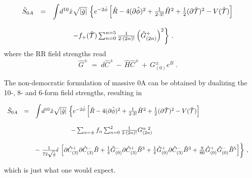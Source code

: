 \documentclass[12pt,a4paper]{article}
\begin{document}
\begin{equation}
\label{eq:0Aaction-2}
\begin{array}{rcl}
\hat{S}_{0A} & = & {\displaystyle\int} d^{10}\hat{x}\sqrt{|\hat{g}|}\,
\left\{e^{-2\hat{\phi}} \left[ \hat{R} -4(\partial\hat{\phi})^{2}
+\frac{1}{2\cdot 3!}\hat{H}^{2}+\frac{1}{2}(\partial\hat{\cal T})^{2}
-V(\hat{\cal T})\right] \right.\\
& & \\
& & 
\hspace{1cm}
\left.
-f_{+}(\hat{\cal T})\sum_{n=0}^{n=5}\frac{1}{2\cdot (2n)!}
\left(\hat{G}_{(2n)}^{+}\right)^{2} 
\right\}\, .\\
\end{array}
\end{equation}
where the RR field strengths read
\begin{equation}
  \hat{G}^{\pm}\;=\; d\hat{C}^{\pm}\,-\,\hat{H}\hat{C}^{\pm}\,+\,
                     G_{(0)}^{\pm}e^{B}\; .
\end{equation}

The non-democratic formulation of massive 0A can be obtained by
dualizing the 10-, 8- and 6-form field strengths, resulting in


\begin{equation}
\label{eq:CS0A-3}
\begin{array}{rcl}
\hat{S}_{0A} & = & {\displaystyle\int} d^{10}\hat{x}\sqrt{|\hat{g}|}\,
\left\{e^{-2\hat{\phi}} \left[ \hat{R} -4(\partial\hat{\phi})^{2}
+\frac{1}{2\cdot 3!}\hat{H}^{2}+\frac{1}{2}(\partial\hat{\cal T})^{2}
-V(\hat{\cal T})\right]\right.
\\
& & \\
& & 
\hspace{2cm}
-\sum_{\alpha =\pm} f_{\alpha}
     \sum_{n=0}^{2} \textstyle{\frac{1}{2\cdot (2n)!}} G_{(2n)}^{\alpha\ 2} 
\\
%
& & \\
% 
& &
-\left. {\textstyle\frac{1}{72\sqrt{\hat{g}}}} 
\hat{\epsilon}\,
\left[
\partial\hat{C}^{+}_{(3)}\partial\hat{C}^{-}_{(3)}\hat{B}
+{\textstyle\frac{1}{4}}\hat{G}^{-}_{(0)}\partial\hat{C}^{+}_{(3)}
\hat{B}^{3}
+{\textstyle\frac{1}{4}}\hat{G}^{+}_{(0)}\partial\hat{C}^{-}_{(3)}
\hat{B}^{3}
+{\textstyle\frac{9}{80}}\hat{G}^{+}_{(0)}\hat{G}^{-}_{(0)}
\hat{B}^{5}
\right]\right\}
\, ,
\end{array}
\end{equation}

\noindent which is just what one would expect.
\end{document}
